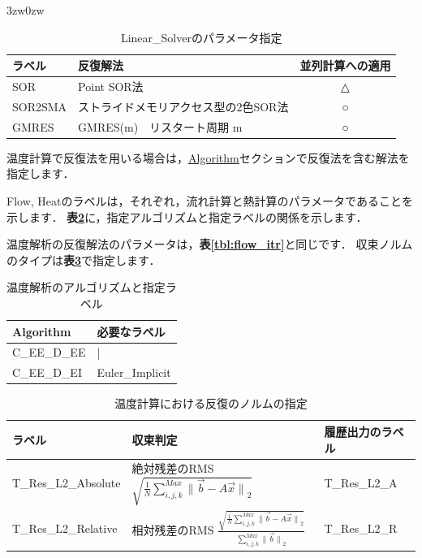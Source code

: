 \begin{indentation}{3zw}{0zw}
\begin{table}[htdp]
\caption{Linear\_Solverのパラメータ指定}
\begin{center}
\small
\begin{tabular}{llc} \toprule
ラベル & 反復解法 & 並列計算への適用\\ \midrule
SOR & Point SOR法 & △\\
SOR2SMA & ストライドメモリアクセス型の2色SOR法 & ○\\ 
GMRES & GMRES(m)　リスタート周期 m & ○\\ 
\bottomrule
\end{tabular}
\end{center}
\label{tbl:LS}
\end{table}


温度計算で反復法を用いる場合は，\hyperlink{tgt:algorithm}{Algorithm}セクションで反復法を含む解法を指定します．

Flow, Heatのラベルは，それぞれ，流れ計算と熱計算のパラメータであることを示します．
\textbf{表\ref{tbl:itr_temp_algo}}に，指定アルゴリズムと指定ラベルの関係を示します．

温度解析の反復解法のパラメータは，\textbf{表\ref{tbl:flow_itr}}と同じです．
収束ノルムのタイプは\textbf{表\ref{tbl:norm-type4temp}}で指定します．

\begin{table}[htdp]
\caption{温度解析のアルゴリズムと指定ラベル}
\begin{center}
\small
\begin{tabular}{ll} \toprule
Algorithm &  必要なラベル\\ \midrule
C\_EE\_D\_EE & | \\
C\_EE\_D\_EI & Euler\_Implicit\\ \bottomrule
\end{tabular}
\end{center}
\label{tbl:itr_temp_algo}
\end{table}

\begin{table}[htdp]
\caption{温度計算における反復のノルムの指定}
\begin{center}
\small
\begin{tabular}{lll} \toprule
ラベル & 収束判定 & 履歴出力のラベル\\ \midrule
\vspace{2mm}
T\_Res\_L2\_Absolute & 絶対残差のRMS $\displaystyle \sqrt{ \frac{1}{N} \sum_{i,j,k}^{Max} {\|\vec{b}- A \vec{x}\|}_{2} }$ & T\_Res\_L2\_A\\ 
T\_Res\_L2\_Relative & 相対残差のRMS $\displaystyle {\frac{ \sqrt{ \frac{1}{N} \sum_{i,j,k}^{Max}{\|\vec{b}- A \vec{x}\|}_{2}} } {\sum_{i,j,k}^{Max} {\|\vec{b}\|}_{2} }}$ & T\_Res\_L2\_R\\ \bottomrule
\end{tabular}
\end{center}
\label{tbl:norm-type4temp}
\end{table}

\end{indentation}
